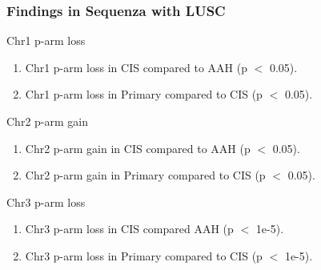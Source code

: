 \documentclass{beamer}
\begin{document}
    \begin{frame}[allowframebreaks]
        \frametitle{Findings in Sequenza with LUSC}

        \begin{block}{Chr1 p-arm loss}
            \begin{enumerate}
                \item Chr1 p-arm loss in CIS compared to AAH (p $<$ 0.05).
                \item Chr1 p-arm loss in Primary compared to CIS (p $<$ 0.05).
            \end{enumerate}

            \begin{table}
                \caption{CGC Tier1 genes in Chr1 p-arm}
                \resizebox{\linewidth}{!}
                {}
            \end{table}
        \end{block}

        \begin{block}{Chr2 p-arm gain}
            \begin{enumerate}
                \item Chr2 p-arm gain in CIS compared to AAH (p $<$ 0.05).
                \item Chr2 p-arm gain in Primary compared to CIS (p $<$ 0.05).
            \end{enumerate}

            \begin{table}
                \caption{CGC Tier1 genes in Chr2 p-arm}
                \resizebox{\linewidth}{!}
                {}
            \end{table}
        \end{block}

        \begin{block}{Chr3 p-arm loss}
            \begin{enumerate}
                \item Chr3 p-arm loss in CIS compared AAH (p $<$ 1e-5).
                \item Chr3 p-arm loss in Primary compared to CIS (p $<$ 1e-5).
            \end{enumerate}

            \begin{table}
                \caption{CGC Tier1 genes in Chr3 p-arm}
                \resizebox{\linewidth}{!}
                {}
            \end{table}
        \end{block}


\end{frame}
\end{document}
